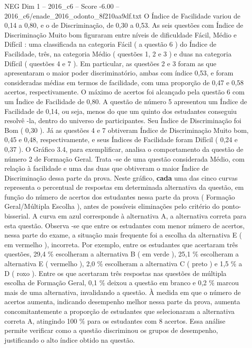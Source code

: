 \begin{textsample}{NEG Dim 1 – 2016\_c6 – Score -6.00 – 2016\_c6/enade\_2016\_odonto\_8f210aa9df.txt}
O Índice de Facilidade variou de 0,14 a 0,80, e o de Discriminação, de 0,30 a 0,53.
As seis questões com Índice de Discriminação Muito bom figuraram entre níveis de dificuldade Fácil, Médio e Difícil : uma classificada na categoria Fácil ( a questão 6 ) do Índice de Facilidade, três, na categoria Médio ( questões 1, 2 e 3 ) e duas na categoria Difícil ( questões 4 e 7 ).
Em particular, as questões 2 e 3 foram as que apresentaram o maior poder discriminatório, ambas com índice 0,53, e foram consideradas médias em termos de facilidade, com uma proporção de 0,47 e 0,58 acertos, respectivamente.
O máximo de acertos foi alcançado pela questão 6 com um Índice de Facilidade de 0,80.
A questão de número 5 apresentou um Índice de Facilidade de 0,14, ou seja, menos do que um quinto dos estudantes conseguiu resolvê -la, dentro do universo de participantes.
Seu Índice de Discriminação foi Bom ( 0,30 ).
Já as questões 4 e 7 obtiveram Índice de Discriminação Muito bom, 0,45 e 0,48, respectivamente, e seus Índices de Facilidade foram Difícil ( 0,24 e 0,37 ).
O Gráfico 3.4, para exemplificar, analisa o comportamento da questão de número 2 de Formação Geral.
Trata -se de uma questão considerada Médio, com relação à facilidade e uma das duas que obtiveram o maior Índice de Discriminação dessa parte da prova.
Neste gráfico, \textbf{cada} uma das cinco curvas representa o percentual de respostas em determinada alternativa da questão, em função do número de acertos dos estudantes nessa parte da prova ( Formação Geral/Múltipla Escolha ), antes de possíveis eliminações pelo critério do ponto-bisserial.
A curva em azul corresponde à alternativa A, a alternativa correta para esta questão.
Observa -se que entre os estudantes com menor número de acertos, nessa parte do exame, a situação mais frequente foi a escolha da alternativa E ( em vermelho ), incorreta.
Por exemplo, entre os estudantes que acertaram três questões, 29,4 \% escolheram a alternativa B ( em verde ), 25,1 \% escolheram a alternativa E ( vermelho ), 2,0 \% escolheram a alternativa C ( preto ) e 1,5 \% a D ( roxo ).
Entre os que acertaram três respostas nas questões de múltipla escolha de Formação Geral, 0,1 \% deixou a questão em branco e 0,2 \% marcou mais de uma alternativa, invalidando a questão.
À medida em que o número de acertos aumenta, indicando desempenho melhor nessa parte da prova, aumenta concomitantemente a proporção de estudantes que selecionaram a alternativa correta A, atingindo 100 \% para os estudantes com 8 acertos.
Essa análise permite verificar como a questão discriminou os grupos de desempenho, justificando o alto índice obtido na questão.

\end{textsample}
